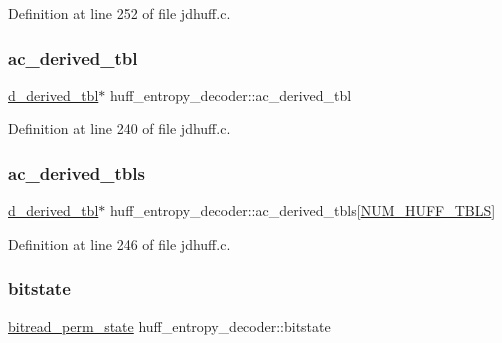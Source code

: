 Definition at line 252 of file jdhuff.\+c.

\mbox{\label{structhuff__entropy__decoder_adbbf18c6aa3065d9bcf6bf33079733e0}} 
\subsubsection{\texorpdfstring{ac\_derived\_tbl}{ac\_derived\_tbl}}
{\footnotesize\ttfamily \mbox{\hyperlink{structd__derived__tbl}{d\+\_\+derived\+\_\+tbl}}$\ast$ huff\+\_\+entropy\+\_\+decoder\+::ac\+\_\+derived\+\_\+tbl}



Definition at line 240 of file jdhuff.\+c.

\mbox{\label{structhuff__entropy__decoder_a19edd8c7e80bfe34c21e6fe35ef90cce}} 
\subsubsection{\texorpdfstring{ac\_derived\_tbls}{ac\_derived\_tbls}}
{\footnotesize\ttfamily \mbox{\hyperlink{structd__derived__tbl}{d\+\_\+derived\+\_\+tbl}}$\ast$ huff\+\_\+entropy\+\_\+decoder\+::ac\+\_\+derived\+\_\+tbls\mbox{[}\mbox{\hyperlink{jpeglib_8h_a6b12985705944e0623b671f29dc5722e}{N\+U\+M\+\_\+\+H\+U\+F\+F\+\_\+\+T\+B\+LS}}\mbox{]}}



Definition at line 246 of file jdhuff.\+c.

\mbox{\label{structhuff__entropy__decoder_a06e5f8944ccb6057c6f72b3df2441223}} 
\subsubsection{\texorpdfstring{bitstate}{bitstate}}
{\footnotesize\ttfamily \mbox{\hyperlink{structbitread__perm__state}{bitread\+\_\+perm\+\_\+state}} huff\+\_\+entropy\+\_\+decoder\+::bitstate}




